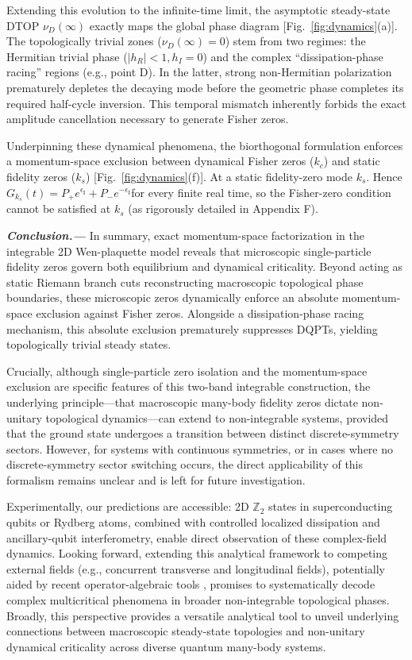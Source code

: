 \documentclass[aps,prb,floatfix,superscriptaddress,reprint]{revtex4-2}
\begin{document}
Extending this evolution to the infinite-time limit, the asymptotic steady-state DTOP $\nu_D(\infty)$ exactly maps the global phase diagram [Fig.~\ref{fig:dynamics}(a)]. The topologically trivial zones ($\nu_D(\infty) = 0$) stem from two regimes: the Hermitian trivial phase ($|h_R|<1, h_I=0$) and the complex ``dissipation-phase racing'' regions (e.g., point D). In the latter, strong non-Hermitian polarization prematurely depletes the decaying mode before the geometric phase completes its required half-cycle inversion. This temporal mismatch inherently forbids the exact amplitude cancellation necessary to generate Fisher zeros.

Underpinning these dynamical phenomena, the biorthogonal formulation enforces a momentum-space exclusion between dynamical Fisher zeros ($k_c$) and static fidelity zeros ($k_s$) [Fig.~\ref{fig:dynamics}(f)].  At a static fidelity-zero mode $k_{s}$. Hence $G_{k_{s}}(t)=P_{+}e^{\epsilon_{\mathrm{I}}}+P_{-}e^{-\epsilon_{\mathrm{I}}}$for
every finite real time, so the Fisher-zero condition cannot be satisfied
at $k_{s}$ (as rigorously detailed in Appendix \textcolor[rgb]{0.00,0.07,1.00}{F}).

\vspace{2mm}
\noindent \textbf{\textit{Conclusion.---}}
In summary, exact momentum-space factorization in the integrable 2D Wen-plaquette model reveals that microscopic single-particle fidelity zeros govern both equilibrium and dynamical criticality. Beyond acting as static Riemann branch cuts reconstructing macroscopic topological phase boundaries, these microscopic zeros dynamically enforce an absolute momentum-space exclusion against Fisher zeros. Alongside a dissipation-phase racing mechanism, this absolute exclusion prematurely suppresses DQPTs, yielding topologically trivial steady states.

Crucially, although single-particle zero isolation and the momentum-space exclusion are specific features of this two-band integrable construction, the underlying principle—that macroscopic many-body fidelity zeros dictate non-unitary topological dynamics—can extend to non-integrable systems, provided that the ground state undergoes a transition between distinct discrete-symmetry sectors. However, for systems with continuous symmetries, or in cases where no discrete-symmetry sector switching occurs, the direct applicability of this formalism remains unclear and is left for future investigation.

Experimentally, our predictions are accessible: 2D $\mathbb{Z}_2$ states in superconducting qubits or Rydberg atoms, combined with controlled localized dissipation and ancillary-qubit interferometry, enable direct observation of these complex-field dynamics. Looking forward, extending this analytical framework to competing external fields (e.g., concurrent transverse and longitudinal fields), potentially aided by recent operator-algebraic tools \cite{Rouz2025,Alberto2025}, promises to systematically decode complex multicritical phenomena in broader non-integrable topological phases. Broadly, this perspective provides a versatile analytical tool to unveil underlying connections between macroscopic steady-state topologies and non-unitary dynamical criticality across diverse quantum many-body systems.
\end{document}
